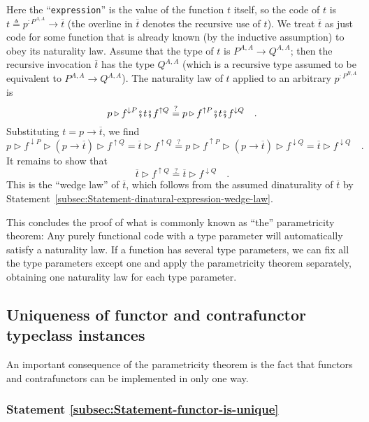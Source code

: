Here the ``\lstinline!expression!'' is the value of the function
$t$ itself, so the code of $t$ is $t\triangleq p^{:P^{A,A}}\rightarrow\overline{t}$
(the overline in $\overline{t}$ denotes the recursive use of $t$).
We treat $\overline{t}$ as just code for some function that is already
known (by the inductive assumption) to obey its naturality law. Assume
that the type of $t$ is $P^{A,A}\rightarrow Q^{A,A}$; then the recursive
invocation $\overline{t}$ has the type $Q^{A,A}$ (which is a recursive
type assumed to be equivalent to $P^{A,A}\rightarrow Q^{A,A}$). The
naturality law of $t$ applied to an arbitrary $p^{:P^{B,A}}$ is
\[
p\triangleright f^{\downarrow P}\bef t\bef f^{\uparrow Q}\overset{?}{=}p\triangleright f^{\uparrow P}\bef t\bef f^{\downarrow Q}\quad.
\]
Substituting $t=p\rightarrow\overline{t}$, we find
\[
p\triangleright f^{\downarrow P}\triangleright(p\rightarrow\overline{t})\triangleright f^{\uparrow Q}=\overline{t}\triangleright f^{\uparrow Q}\overset{?}{=}p\triangleright f^{\uparrow P}\triangleright(p\rightarrow\overline{t})\triangleright f^{\downarrow Q}=\overline{t}\triangleright f^{\downarrow Q}\quad.
\]
It remains to show that 
\[
\overline{t}\triangleright f^{\uparrow Q}\overset{?}{=}\overline{t}\triangleright f^{\downarrow Q}\quad.
\]
This is the ``wedge law'' of $\overline{t}$, which follows from
the assumed dinaturality of $\overline{t}$ by Statement~\ref{subsec:Statement-dinatural-expression-wedge-law}.

This concludes the proof of what is commonly known as ``the'' parametricity
theorem: Any purely functional code with a type parameter will automatically
satisfy a naturality law. If a function has several type parameters,
we can fix all the type parameters except one and apply the parametricity
theorem separately, obtaining one naturality law for each type parameter.

\subsection{Uniqueness of functor and contrafunctor typeclass instances\label{sec:Uniqueness-of-functor-and-contrafunctor}}

An important consequence of the parametricity theorem is the fact
that functors and contrafunctors can be implemented in only one way.

\subsubsection{Statement \label{subsec:Statement-functor-is-unique}\ref{subsec:Statement-functor-is-unique}}


